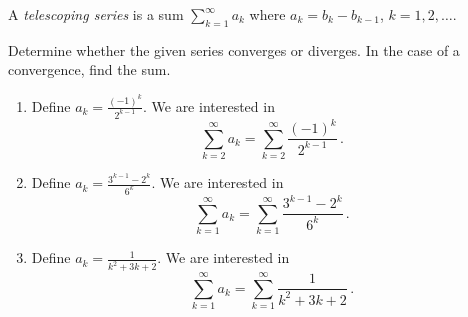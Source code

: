 \documentclass[week=5]{homework}
\date{\today}
\begin{document}
    \maketitle
    \thispagestyle{empty}
    \newpage
    \begin{questions}
		\let\firstquestion\question
		\renewcommand*{\question}{\vspace{7mm}\firstquestion}
        \firstquestion
        A \textit{telescoping series} is a sum $\sum_{k=1}^{\infty} a_k$ where $a_k = b_k - b_{k-1}$, $k = 1, 2, \ldots$.
        
    
	    \question
	    Determine whether the given series converges or diverges. In the case of a convergence, find the sum.
	    
	    
	    \begin{enumerate}[label=(\alph*)]
	    	\item Define $a_k = \frac{(-1)^k}{2^{k-1}}$. We are interested in 
	    	\[
		    	\sum_{k=2}^{\infty} a_k = \sum_{k=2}^{\infty} \frac{(-1)^k}{2^{k-1}}\,.
	    	\]
	    	
	    	\item Define $a_k = \frac{3^{k-1} - 2^k}{6^k}$. We are interested in 
	    	\[
	    	\sum_{k=1}^{\infty} a_k = \sum_{k=1}^{\infty} \frac{3^{k-1} - 2^k}{6^k}\,.
	    	\]
	    	
	    	\item Define $a_k = \frac{1}{k^2 + 3k + 2}$. We are interested in 
	    	\[
	    	\sum_{k=1}^{\infty} a_k = \sum_{k=1}^{\infty} \frac{1}{k^2 + 3k + 2}\,.
	    	\]
	    	

\end{enumerate}
\end{questions}
\end{document}

